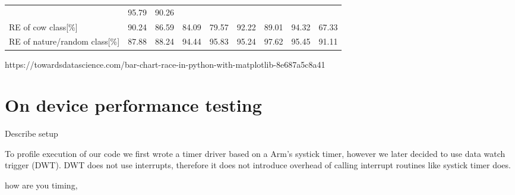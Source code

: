 \begin{table}[ht]
{\begin{tabular}{lrrrrrrrr}
                                        & \cellcolor{tbgreen}  95.79 
                                        & \cellcolor{tbyellow} 90.26 \\
        RE of cow class[\%]             & \cellcolor{tbyellow} 90.24 
                                        & \cellcolor{tbyellow} 86.59 
                                        & \cellcolor{tbyellow} 84.09 
                                        & \cellcolor{tbyellow} 79.57 
                                        & \cellcolor{tbgreeny} 92.22 
                                        & \cellcolor{tbyellow} 89.01 
                                        & \cellcolor{tbgreen} 94.32 
                                        & \cellcolor{tbred} 67.33 \\
        RE of nature/random class[\%]   & \cellcolor{tbyellow} 87.88 
                                        & \cellcolor{tbyellow} 88.24 
                                        & \cellcolor{tbyellow} 94.44 
                                        & \cellcolor{tbgreeny} 95.83 
                                        & \cellcolor{tbgreeny} 95.24 
                                        & \cellcolor{tbgreen} 97.62 
                                        & \cellcolor{tbgreeny} 95.45 
                                        & \cellcolor{tbyellow} 91.11 \\
    \end{tabular}}
    \label{precision_recall_table_ei}
\end{table}

https://towardsdatascience.com/bar-chart-race-in-python-with-matplotlib-8e687a5c8a41


\section{ On device performance testing}
Describe setup

To profile execution of our code we first wrote a timer driver based on a Arm's systick timer, however we later decided to use data watch trigger (DWT).
DWT does not use interrupts, therefore it does not introduce overhead of calling interrupt routines like systick timer does.


      how are you timing, 


